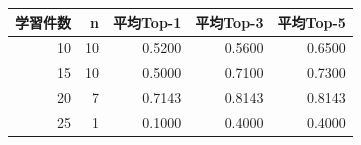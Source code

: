 \begin{tabular}{r r r r r}
\hline
学習件数 & n & 平均Top-1 & 平均Top-3 & 平均Top-5 \\
\hline
10 & 10 & 0.5200 & 0.5600 & 0.6500 \\
15 & 10 & 0.5000 & 0.7100 & 0.7300 \\
20 & 7 & 0.7143 & 0.8143 & 0.8143 \\
25 & 1 & 0.1000 & 0.4000 & 0.4000 \\
\hline
\end{tabular}
